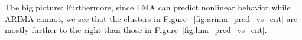 

The big picture: Furthermore, since LMA can predict nonlinear behavior
while ARIMA cannot, we see that the clusters in Figure
~\ref{fig:arima_pred_vs_ent} are mostly further to the right than
those in Figure~\ref{fig:lma_pred_vs_ent}.
